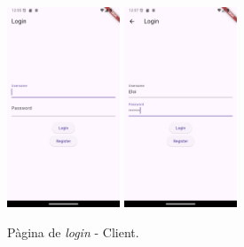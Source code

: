 \documentclass[a4paper,12pt,twoside]{ThesisStyle}
\begin{document}
\begin{figure}[h]
    \centering
    \includegraphics[width=0.3\textwidth]{imatges/login.png}
    \includegraphics[width=0.3\textwidth]{imatges/loginWithValue.png}
    \caption{Pàgina de \textit{login} - Client.}
    \label{fig: Pàgina de login - client}
\end{figure}
\end{document}
